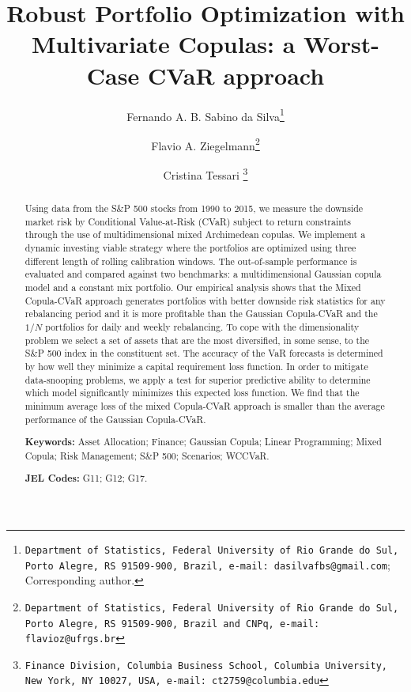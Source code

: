 \documentclass[a4paper,10pt]{article}
\begin{document}
\title{Robust Portfolio Optimization with Multivariate Copulas: a Worst-Case CVaR approach}
\author[]{ Fernando A. B. Sabino da Silva\thanks{\texttt{Department of Statistics, Federal University of Rio Grande do Sul, Porto Alegre, RS 91509-900, Brazil, e-mail: dasilvafbs@gmail.com}; Corresponding author.}}
\author[]{Flavio A. Ziegelmann\thanks{\texttt{Department of Statistics, Federal University of Rio Grande do Sul, Porto Alegre, RS 91509-900, Brazil and CNPq, e-mail: flavioz@ufrgs.br}}}
\author[]{Cristina Tessari \thanks{\texttt{Finance Division, Columbia Business School, Columbia University, New York, NY 10027, USA,
			e-mail: ct2759@columbia.edu}}}
\affil[]{}
\date{}
\maketitle

\begin{abstract}
Using data from the S\&P 500 stocks from 1990 to 2015, we measure the downside market risk by Conditional Value-at-Risk (CVaR) subject to return constraints through the use of multidimensional mixed Archimedean copulas. We implement a dynamic investing viable strategy where the portfolios are optimized using three different length of rolling calibration windows. The out-of-sample performance is evaluated and compared against two benchmarks: a multidimensional Gaussian copula model and a constant mix portfolio. Our empirical analysis shows that the Mixed Copula-CVaR approach generates portfolios with better downside risk statistics for any rebalancing period and it is more profitable than the Gaussian Copula-CVaR and the $1/N$ portfolios for daily and weekly rebalancing. To cope with the dimensionality problem we select a set of assets that are the most diversified, in some sense, to the S\&P 500 index in the constituent set. The accuracy of the VaR forecasts is determined by how well they minimize a capital requirement loss function. In order to mitigate data-snooping problems, we apply a test for superior predictive ability to determine which model significantly minimizes this expected loss function. We find that the minimum average loss of the mixed Copula-CVaR approach is smaller than the average performance of the Gaussian Copula-CVaR.


\smallskip

\smallskip

 \textbf{Keywords:} Asset Allocation; Finance; Gaussian Copula; Linear Programming; Mixed Copula; Risk Management; S\&P 500; Scenarios; WCCVaR.

 \textbf{JEL Codes:} G11; G12; G17.
\end{abstract}
\end{document}
